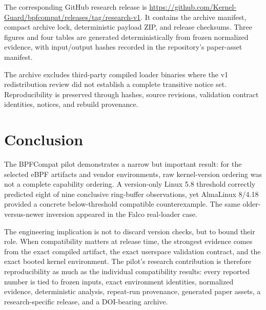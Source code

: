 \documentclass[10pt]{article}
\begin{document}
The corresponding GitHub research release is \url{https://github.com/Kernel-Guard/bpfcompat/releases/tag/research-v1}. It contains the archive manifest, compact archive lock, deterministic payload ZIP, and release checksums. Three figures and four tables are generated deterministically from frozen normalized evidence, with input/output hashes recorded in the repository's paper-asset manifest.

The archive excludes third-party compiled loader binaries where the v1 redistribution review did not establish a complete transitive notice set. Reproducibility is preserved through hashes, source revisions, validation contract identities, notices, and rebuild provenance.

\section{Conclusion}
The BPFCompat pilot demonstrates a narrow but important result: for the selected eBPF artifacts and vendor environments, raw kernel-version ordering was not a complete capability ordering. A version-only Linux 5.8 threshold correctly predicted eight of nine conclusive ring-buffer observations, yet AlmaLinux 8/4.18 provided a concrete below-threshold compatible counterexample. The same older-versus-newer inversion appeared in the Falco real-loader case.

The engineering implication is not to discard version checks, but to bound their role. When compatibility matters at release time, the strongest evidence comes from the exact compiled artifact, the exact userspace validation contract, and the exact booted kernel environment. The pilot's research contribution is therefore reproducibility as much as the individual compatibility results: every reported number is tied to frozen inputs, exact environment identities, normalized evidence, deterministic analysis, repeat-run provenance, generated paper assets, a research-specific release, and a DOI-bearing archive.
\end{document}
